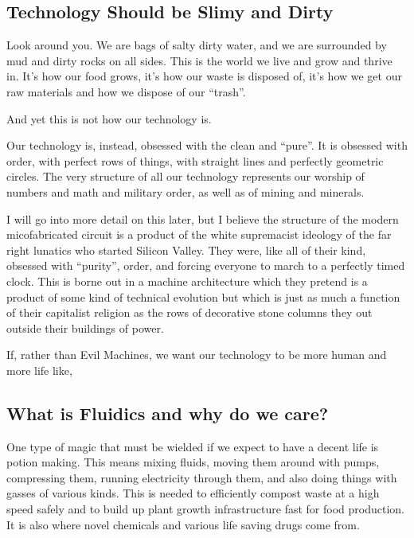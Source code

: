 \subsection{Technology Should be Slimy and
Dirty}\label{technology-should-be-slimy-and-dirty}

Look around you. We are bags of salty dirty water, and we are surrounded
by mud and dirty rocks on all sides. This is the world we live and grow
and thrive in. It's how our food grows, it's how our waste is disposed
of, it's how we get our raw materials and how we dispose of our
``trash''.

And yet this is not how our technology is.

Our technology is, instead, obsessed with the clean and ``pure''. It is
obsessed with order, with perfect rows of things, with straight lines
and perfectly geometric circles. The very structure of all our
technology represents our worship of numbers and math and military
order, as well as of mining and minerals.

I will go into more detail on this later, but I believe the structure of
the modern micofabricated circuit is a product of the white supremacist
ideology of the far right lunatics who started Silicon Valley. They
were, like all of their kind, obsessed with ``purity'', order, and
forcing everyone to march to a perfectly timed clock. This is borne out
in a machine architecture which they pretend is a product of some kind
of technical evolution but which is just as much a function of their
capitalist religion as the rows of decorative stone columns they out
outside their buildings of power.

If, rather than Evil Machines, we want our technology to be more human
and more life like,

\subsection{What is Fluidics and why do we
care?}\label{what-is-fluidics-and-why-do-we-care}

One type of magic that must be wielded if we expect to have a decent
life is potion making. This means mixing fluids, moving them around with
pumps, compressing them, running electricity through them, and also
doing things with gasses of various kinds. This is needed to efficiently
compost waste at a high speed safely and to build up plant growth
infrastructure fast for food production. It is also where novel
chemicals and various life saving drugs come from.

